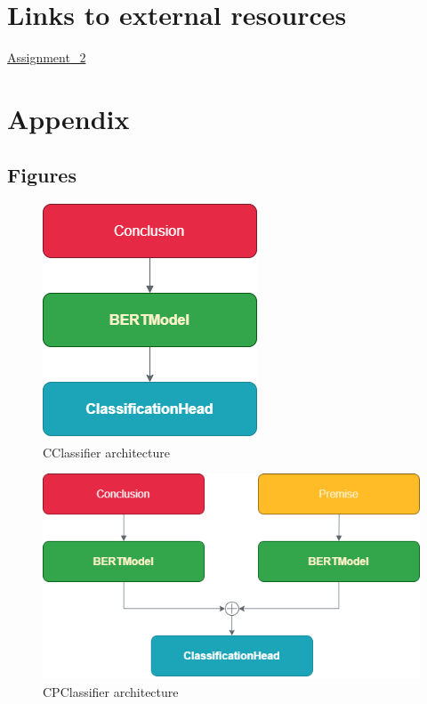 \documentclass[11pt]{article}
\begin{document}
\section{Links to external resources}
\label{sec:links}
\href{https://github.com/antoniototimorelli/nlp_unibo_2023-24_assignments/tree/main/Assignment_2}{Assignment\_2}

\nocite{*}


\clearpage
\onecolumn 
\appendix
\section*{Appendix}
\subsection*{Figures}
\begin{figure}[H]
        \centering
        \includegraphics[scale=0.50]{img/C.png}
        \caption{CClassifier architecture}
        \label{fig:conclusion}
\end{figure}

\begin{figure}[H]
        \centering
        \includegraphics[scale=0.50]{img/CP.png}
        \caption{CPClassifier architecture}
        \label{fig:con_prem}
\end{figure}
\end{document}
